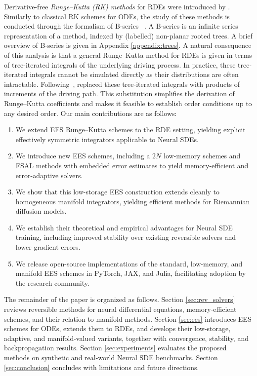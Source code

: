 \documentclass{article}
\theoremstyle{definition}
\theoremstyle{remark}
\begin{document}
Derivative-free \emph{Runge--Kutta (RK) methods} for RDEs were introduced by \cite{redmann2022runge}. Similarly to classical RK schemes for ODEs, the study of these methods is conducted through the formalism of B-series ~\citep{hairer2006geometric,mclachlan2015butcher,butcher2021b}. A B-series is an infinite series representation of a method, indexed by (labelled) non-planar rooted trees. A brief overview of B-series is given in Appendix \ref{appendix:trees}. A natural consequence of this analysis is that a general Runge--Kutta method for RDEs is given in terms of tree-iterated integrals of the underlying driving process. In practice, these tree-iterated integrals cannot be simulated directly as their distributions are often intractable. Following~\citep{deya2012milstein}, \cite{redmann2022runge} replaced these tree-iterated integrals with products of increments of the driving path. This substitution simplifies the derivation of Runge--Kutta coefficients and makes it feasible to establish order conditions up to any desired order.
\clearpage
{} Our main contributions are as follows:
\begin{enumerate}[]
    \item We extend EES Runge--Kutta schemes to the RDE setting, yielding explicit effectively symmetric integrators applicable to Neural SDEs.
    \item We introduce new EES schemes, including a $2N$ low-memory schemes and FSAL methods with embedded error estimates to yield memory-efficient and error-adaptive solvers.
    \item We show that this low-storage EES construction extends cleanly to homogeneous manifold integrators, yielding efficient methods for Riemannian diffusion models.
    \item We establish their theoretical and empirical advantages for Neural SDE training, including improved stability over existing reversible solvers and lower gradient errors.
    \item We release open-source implementations of the standard, low-memory, and manifold EES schemes in PyTorch, JAX, and Julia, facilitating adoption by the research community.
\end{enumerate}
The remainder of the paper is organized as follows. Section \ref{sec:rev_solvers} reviews reversible methods for neural differential equations, memory-efficient schemes, and their relation to manifold methods. Section \ref{sec:ees} introduces EES schemes for ODEs, extends them to RDEs, and develops their low-storage, adaptive, and manifold-valued variants, together with convergence, stability, and backpropagation results. Section \ref{sec:experiments} evaluates the proposed methods on synthetic and real-world Neural SDE benchmarks. Section \ref{sec:conclusion} concludes with limitations and future directions.
\end{document}
